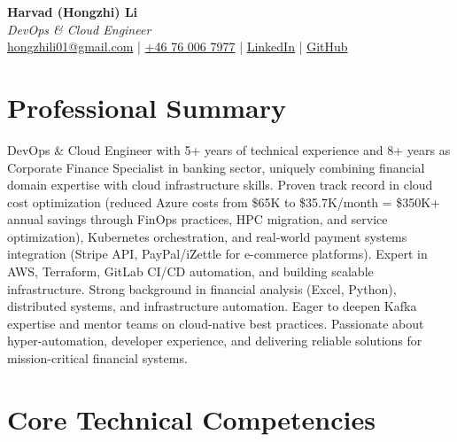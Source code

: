 \documentclass[11pt,a4paper]{article}
\begin{document}
\begin{center}
{\LARGE \textbf{Harvad (Hongzhi) Li}}\\[10pt]
{\Large \textit{DevOps \& Cloud Engineer}}\\[10pt]
\textcolor{titlecolor}{\href{mailto:hongzhili01@gmail.com}{hongzhili01@gmail.com} | \href{tel:+46760067977}{+46 76 006 7977} | \href{https://www.linkedin.com/in/harvad/}{LinkedIn} | \href{https://github.com/bluehawana}{GitHub}}
\end{center}

\vspace{8pt}

\section*{Professional Summary}

DevOps \& Cloud Engineer with 5+ years of technical experience and 8+ years as Corporate Finance Specialist in banking sector, uniquely combining financial domain expertise with cloud infrastructure skills. Proven track record in cloud cost optimization (reduced Azure costs from \$65K to \$35.7K/month = \$350K+ annual savings through FinOps practices, HPC migration, and service optimization), Kubernetes orchestration, and real-world payment systems integration (Stripe API, PayPal/iZettle for e-commerce platforms). Expert in AWS, Terraform, GitLab CI/CD automation, and building scalable infrastructure. Strong background in financial analysis (Excel, Python), distributed systems, and infrastructure automation. Eager to deepen Kafka expertise and mentor teams on cloud-native best practices. Passionate about hyper-automation, developer experience, and delivering reliable solutions for mission-critical financial systems.

\section*{Core Technical Competencies}
\end{document}
